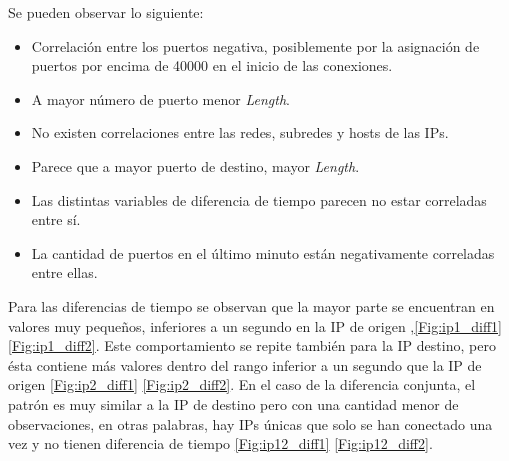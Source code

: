Se pueden observar lo siguiente:

\begin{itemize}
    \item Correlación entre los puertos negativa, posiblemente por la asignación de puertos por encima de 40000 en el inicio de las conexiones.
    \item A mayor número de puerto menor \textit{Length}.
    \item No existen correlaciones entre las redes, subredes y hosts de las IPs.
    \item Parece que a mayor puerto de destino, mayor \textit{Length}.
    \item Las distintas variables de diferencia de tiempo parecen no estar correladas entre sí.
    \item La cantidad de puertos en el último minuto están negativamente correladas entre ellas.
\end{itemize}

Para las diferencias de tiempo se observan que la mayor parte se encuentran en valores muy pequeños, inferiores a un segundo en la IP de origen ,\ref{Fig:ip1_diff1} \ref{Fig:ip1_diff2}. Este comportamiento se repite también para la IP destino, pero ésta contiene más valores dentro del rango inferior a un segundo que la IP de origen \ref{Fig:ip2_diff1} \ref{Fig:ip2_diff2}. En el caso de la diferencia conjunta, el patrón es muy similar a la IP de destino pero con una cantidad menor de observaciones, en otras palabras, hay IPs únicas que solo se han conectado una vez y no tienen diferencia de tiempo \ref{Fig:ip12_diff1} \ref{Fig:ip12_diff2}.

